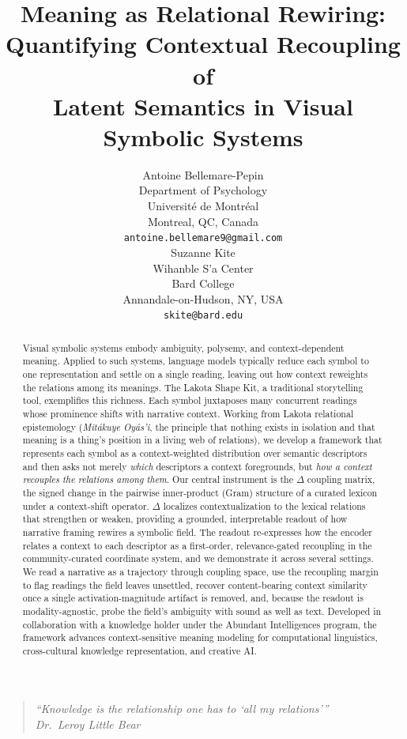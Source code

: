 \documentclass[final,creativeai]{article}
\title{Meaning as Relational Rewiring:\\Quantifying Contextual Recoupling of\\Latent Semantics in Visual Symbolic Systems}
\author{%
  Antoine Bellemare-Pepin \\
  Department of Psychology \\
  Université de Montréal \\
  Montreal, QC, Canada \\
  \texttt{antoine.bellemare9@gmail.com} \\
  \And
  Suzanne Kite \\
  Wihanble S'a Center \\
  Bard College \\
  Annandale-on-Hudson, NY, USA \\
  \texttt{skite@bard.edu} \\
}
\begin{document}
\maketitle

\begin{abstract}
Visual symbolic systems embody ambiguity, polysemy, and context-dependent meaning. Applied to such systems, language models typically reduce each symbol to one representation and settle on a single reading, leaving out how context reweights the relations among its meanings. The Lakota Shape Kit, a traditional storytelling tool, exemplifies this richness. Each symbol juxtaposes many concurrent readings whose prominence shifts with narrative context. Working from Lakota relational epistemology (\emph{Mitákuye Oyás'i}, the principle that nothing exists in isolation and that meaning is a thing's position in a living web of relations), we develop a framework that represents each symbol as a context-weighted distribution over semantic descriptors and then asks not merely \emph{which} descriptors a context foregrounds, but \emph{how a context recouples the relations among them}. Our central instrument is the $\Delta$ coupling matrix, the signed change in the pairwise inner-product (Gram) structure of a curated lexicon under a context-shift operator. $\Delta$ localizes contextualization to the lexical relations that strengthen or weaken, providing a grounded, interpretable readout of how narrative framing rewires a symbolic field. The readout re-expresses how the encoder relates a context to each descriptor as a first-order, relevance-gated recoupling in the community-curated coordinate system, and we demonstrate it across several settings. We read a narrative as a trajectory through coupling space, use the recoupling margin to flag readings the field leaves unsettled, recover content-bearing context similarity once a single activation-magnitude artifact is removed, and, because the readout is modality-agnostic, probe the field's ambiguity with sound as well as text. Developed in collaboration with a knowledge holder under the Abundant Intelligences program, the framework advances context-sensitive meaning modeling for computational linguistics, cross-cultural knowledge representation, and creative AI.
\end{abstract}

\begin{quote}
\itshape ``Knowledge is the relationship one has to `all my relations'{}''\\[0.25em]
\upshape\hfill Dr.\ Leroy Little Bear
\end{quote}
\end{document}
